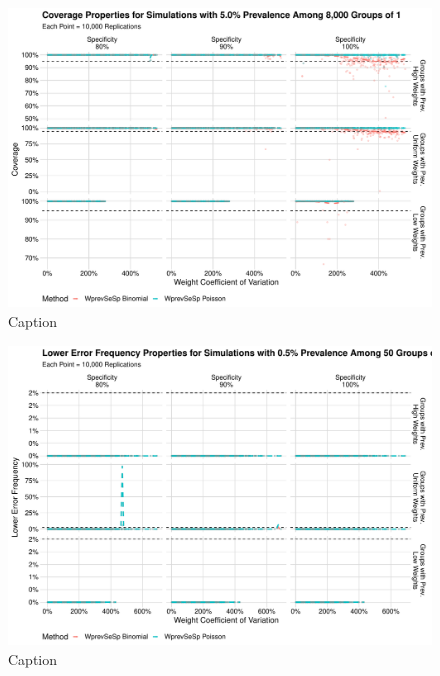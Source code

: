 \documentclass[AMA,STIX1COL]{WileyNJD-v2}
\begin{document}
\begin{figure}
    \centering
    \includegraphics[width=\textwidth]{figures/imperfect_coverage_8000_0_05_reduced.pdf}
    \caption{Caption}
    \label{fig:imperfect_coverage_8000_0_05_reduced.pdf}
\end{figure}


\begin{figure}
    \centering
    \includegraphics[width=\textwidth]{figures/imperfect_lower_error_frequency_50_0_005_reduced.pdf}
    \caption{Caption}
    \label{fig:imperfect_lower_error_frequency_50_0_005_reduced}
\end{figure}
\end{document}

